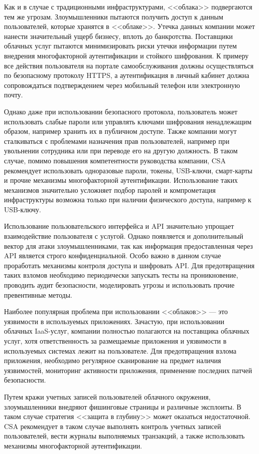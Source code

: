 Как и в случае с традиционными инфраструктурами, <<облака>> подвергаются тем же угрозам.
Злоумышленники пытаются получить доступ к данным пользователей, которые хранятся в <<облаке>>.
Утечка данных компании может нанести значительный ущерб бизнесу, вплоть до банкротства.
Поставщики облачных услуг пытаются минимизировать риски утечки информации путем внедрения многофакторной аутентификации и стойкого шифрования.
К примеру все действия пользователя на портале самообслуживания должны осуществляться по безопасному протоколу HTTPS, а аутентификация в личный кабинет должна сопровождаться подтверждением через мобильный телефон или электронную почту.

Однако даже при использовании безопасного протокола, пользователь может использовать слабые пароли или управлять ключами шифрования ненадлежащим образом, например хранить их в публичном доступе.
Также компании могут сталкиваться с проблемами назначения прав пользователей, например при увольнении сотрудника или при переводе его на другую должность.
В таком случае, помимо повышения компетентности руководства компании, CSA рекомендует использовать одноразовые пароли, токены, USB-ключи, смарт-карты и прочие механизмы многофакторной аутентификации.
Использование таких механизмов значительно усложняет подбор паролей и компрометация инфраструктуры возможна только при наличии физического доступа, например к USB-ключу.

Использование пользовательского интерфейса и API значительно упрощает взаимодействие пользователя с услугой.
Однако появляется и дополнительный вектор для атаки злоумышленниками, так как информация предоставленная через API является строго конфиденциальной.
Особо важно в данном случае проработать механизмы контроля доступа и шифровать API.
Для предотвращения таких взломов необходимо периодически запускать тесты на проникновение, проводить аудит безопасности, моделировать угрозы и использовать прочие превентивные методы.

Наиболее популярная проблема при использовании <<облаков>> --- это уязвимости в используемых приложениях.
Зачастую, при использовании облачных IaaS-услуг, компании полностью полагаются на поставщика облачных услуг, хотя ответственность за размещаемые приложения и уязвимости в используемых системах лежит на пользователе.
Для предотвращения взлома приложения, необходимо регулярное сканирование на предмет наличия уязвимостей, мониторинг активности приложения, применение последних патчей безопасности.

Путем кражи учетных записей пользователей облачного окружения, злоумышленники внедряют фишинговые страницы и различные эксплоиты.
В таком случае стратегия <<защита в глубину>> может оказаться недостаточной.
CSA рекомендует в таком случае выполнять контроль учетных записей пользователей, вести журналы выполняемых транзакций, а также использовать механизмы многофакторной аутентификации.

